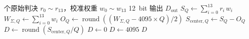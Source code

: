 \documentclass[
  UTF8,
  a4paper,
  11pt,
  oneside,
  fontset=fandol
]{ctexrep}
\newcommand{\round}{\operatorname{round}}
\newcommand{\Dout}{D_{\mathrm{out}}}
\newcommand{\roundop}[1]{\round\!\left(#1\right)}
\begin{document}
\begin{algorithm}[H]
\caption{正常转换加权解码}
\label{alg:decode}
\begin{algorithmic}[1]
 个原始判决 $r_0 \sim r_{13}$，校准权重 $w_0 \sim w_{13}$
\Ensure \SI{12}{bit} 输出 $\Dout$
\State $S_Q \gets \sum_{i=0}^{13} r_i \, w_i$
\State $W_{\Sigma,Q} \gets \sum_{i=0}^{13} w_i$
\State $O_Q \gets \roundop{(W_{\Sigma,Q} - 4095 \times Q) / 2}$
\State $S_{\mathrm{center},Q} \gets S_Q - O_Q$
\State $D \gets \roundop{S_{\mathrm{center},Q} / Q}$
 \State $D \gets 0$  \State $D \gets 4095$ \EndIf
\State \Return $D$
\end{algorithmic}
\end{algorithm}
\end{document}
